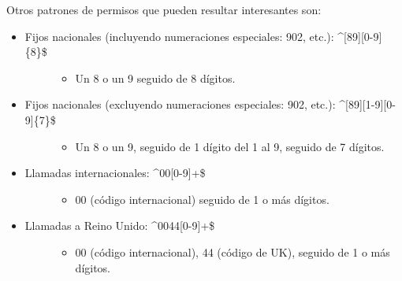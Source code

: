 \documentclass[letterpaper,10pt,spanish]{sphinxmanual}
\begin{document}
Otros patrones de permisos que pueden resultar interesantes son:
\begin{itemize}
\item {} \begin{description}
\item[{Fijos nacionales (incluyendo numeraciones especiales: 902, etc.): \textasciicircum{}{[}89{]}{[}0-9{]}\{8\}\$}] \leavevmode\begin{itemize}
\item {} 
Un 8 o un 9 seguido de 8 dígitos.

\end{itemize}

\end{description}

\item {} \begin{description}
\item[{Fijos nacionales (excluyendo numeraciones especiales: 902, etc.): \textasciicircum{}{[}89{]}{[}1-9{]}{[}0-9{]}\{7\}\$}] \leavevmode\begin{itemize}
\item {} 
Un 8 o un 9, seguido de 1 dígito del 1 al 9, seguido de 7 dígitos.

\end{itemize}

\end{description}

\item {} \begin{description}
\item[{Llamadas internacionales: \textasciicircum{}00{[}0-9{]}+\$}] \leavevmode\begin{itemize}
\item {} 
00 (código internacional) seguido de 1 o más dígitos.

\end{itemize}

\end{description}

\item {} \begin{description}
\item[{Llamadas a Reino Unido: \textasciicircum{}0044{[}0-9{]}+\$}] \leavevmode\begin{itemize}
\item {} 
00 (código internacional), 44 (código de UK), seguido de 1 o más dígitos.

\end{itemize}

\end{description}

\end{itemize}
\end{document}
